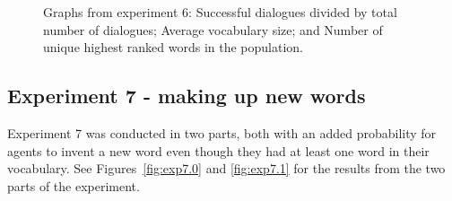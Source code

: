 \begin{figure}
    \centering
    \hfill
    \par \bigskip
    \caption{Graphs from experiment 6:  Successful dialogues divided by total number of dialogues;  Average vocabulary size; and  Number of unique highest ranked words in the population.}
    \label{fig:exp6.1}
\end{figure}

\clearpage
\subsection{Experiment 7 - making up new words}
Experiment 7 was conducted in two parts, both with an added probability for agents to invent a new word even though they had at least one word in their vocabulary. See Figures~\ref{fig:exp7.0} and \ref{fig:exp7.1} for the results from the two parts of the experiment.

